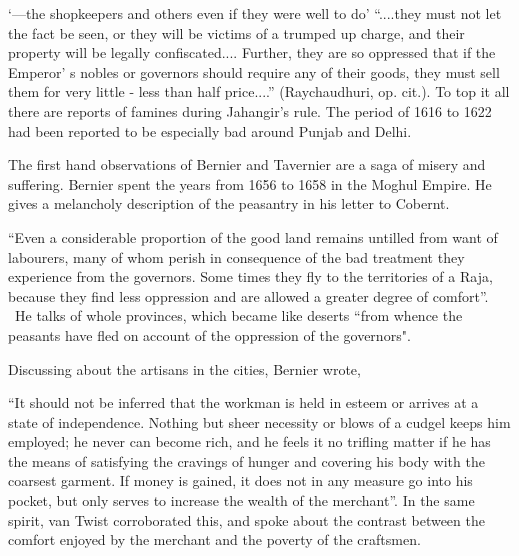 ‘---the shopkeepers and others even if they were well to do’ ``....they must not let the fact be seen, or they will be victims of a trumped up charge, and their property will be legally confiscated....  Further, they are so oppressed that if the Emperor'	s nobles or governors should require any of their goods, they must sell them for very little - less than half price....” (Raychaudhuri, op. cit.). To top it all there are reports of famines during Jahangir's rule. The period of 1616 to 1622 had been reported to be especially bad around Punjab and Delhi. 

\vspace{.1cm}

The first hand observations of Bernier and Tavernier are a saga of misery and suffering. Bernier spent the years from 1656 to 1658 in the Moghul Empire. He gives a melancholy description of the peasantry in his letter to Cobernt. 

\vspace{.1cm}

“Even a considerable proportion of the good land remains untilled from want of labourers, many of whom perish in consequence of the bad treatment they experience from the governors. Some times they fly to the territories of a Raja, because they find less oppression and are allowed a greater degree of comfort”. ~He talks of whole provinces, which became like deserts ``from whence the peasants have fled on account of the oppression of the governors". 

\vspace{.1cm}

Discussing about the artisans in the cities, Bernier wrote, 

\vspace{.1cm}

“It should not be inferred that the workman is held in esteem or arrives at a state of independence. Nothing but sheer necessity or blows of a cudgel keeps him employed; he never can become rich, and he feels it no trifling matter if he has the means of satisfying the cravings of hunger and covering his body with the coarsest garment. If money is gained, it does not in any measure go into his pocket, but only serves to increase the wealth of the merchant”. In the same spirit, van Twist corroborated this, and spoke about the contrast between the comfort enjoyed by the merchant and the poverty of the craftsmen.

\vspace{.1cm}

